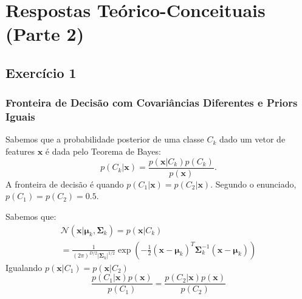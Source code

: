 \documentclass[conference]{IEEEtran}
\begin{document}
\section{Respostas Teórico-Conceituais (Parte 2)}
\label{sec:teoria}

\subsection{Exercício 1}
\label{subsec:ex1}
\subsubsection{Fronteira de Decisão com Covariâncias Diferentes e Priors Iguais}

Sabemos que a probabilidade posterior de uma classe $C_k$ dado um vetor de features $\mathbf{x}$ é dada pelo Teorema de Bayes:
\[
p(C_k | \mathbf{x}) = \frac{p(\mathbf{x} | C_k) p(C_k)}{p(\mathbf{x})}.
\]
A fronteira de decisão é quando $p(C_1 | \mathbf{x}) = p(C_2 | \mathbf{x})$.
Segundo o enunciado,  $p(C_1) = p(C_2) = 0.5$.

Sabemos que:
\begin{multline*}
  \mathcal{N}(\mathbf{x} | \boldsymbol{\mu}_k, \boldsymbol{\Sigma}_k) = p(\mathbf{x} | C_k) \\
= \frac{1}{(2\pi)^{D/2} |\boldsymbol{\Sigma}_k|^{1/2}}  \exp\left(-\frac{1}{2} (\mathbf{x} - \boldsymbol{\mu}_k)^T \boldsymbol{\Sigma}_k^{-1} (\mathbf{x} - \boldsymbol{\mu}_k)\right) 
\end{multline*}
Igualando $p(\mathbf{x} | C_1) = p(\mathbf{x} | C_2)$
\[
\frac{p(C_1 | \mathbf{x})p(\mathbf{x})}{p(C_1)} = \frac{p(C_2 | \mathbf{x})p(\mathbf{x})}{p(C_2)} 
\]
\end{document}
